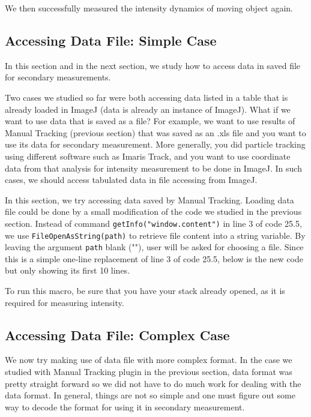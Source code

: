 \documentclass[11pt,a4paper,oneside]{report}
\newcommand{\ilcom}[1]{\texttt{\small#1}}
\begin{document}
We then successfully measured the intensity dynamics of moving object again.  

\newpage
\subsection{Accessing Data File: Simple Case}
In this section and in the next section, 
we study how to access data in saved file for secondary measurements. 

Two cases we studied so far were both accessing data listed in a table that is already loaded in ImageJ 
(data is already an instance of ImageJ). What if we want to use data that is saved as a file? For example, 
we want to use results of Manual Tracking (previous section) that was saved as an .xls file and 
you want to use its data for secondary measurement. More generally, you did particle tracking using different software 
such as Imaris Track, and you want to use  coordinate data from that analysis for intensity measurement to be done in ImageJ. 
In such cases, we should access tabulated data in file accessing from ImageJ. 

In this section, we try accessing data saved by Manual Tracking. 
Loading data file could be done by a small modification 
of the code we studied in the previous section. Instead of command 
\ilcom{getInfo("window.content")} in line 3 of code 25.5, we use \ilcom{FileOpenAsString(path)} to retrieve 
file content into a string variable.  By leaving the argument \ilcom{path} blank (""), user will be asked for choosing a file. 
Since this is a simple one-line replacement of line 3 of code 25.5, below is the new code but only showing its first 10 lines.  



To run this macro, be sure that you have your stack already opened, as it is required for measuring intensity. 

\subsection{Accessing Data File: Complex Case}

We now try making use of data file with more complex format. 
In the case we studied with Manual Tracking plugin in the previous section, data format was pretty straight forward 
so we did not have to do much work for dealing with the data format. 
In general, things are not so simple and one must figure out some way to decode the format for using it in secondary measurement. 
\end{document}
